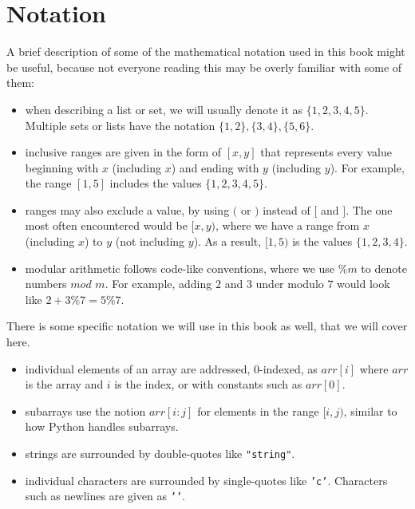 \section*{Notation}

A brief description of some of the mathematical notation used in this book might be useful, because not everyone reading this may be overly familiar with some of them:
\begin{itemize}
\item when describing a list or set, we will usually denote it as $\{1,2,3,4,5\}$. Multiple sets or lists have the notation $\{1,2\},\{3,4\},\{5,6\}$.
\item inclusive ranges are given in the form of $[x,y]$ that represents every value beginning with $x$ (including $x$) and ending with $y$ (including $y$). For example, the range $[1,5]$ includes the values $\{1,2,3,4,5\}$.
\item ranges may also exclude a value, by using $($ or $)$ instead of $[$ and $]$. The one most often encountered would be $[x,y)$, where we have a range from $x$ (including $x$) to $y$ (not including $y$). As a result, $[1,5)$ is the values $\{1,2,3,4\}$.
\item modular arithmetic follows code-like conventions, where we use $\%m$ to denote numbers $mod$ $m$. For example, adding $2$ and $3$ under modulo $7$ would look like $2 + 3 \% 7 = 5 \% 7$.
\end{itemize}

There is some specific notation we will use in this book as well, that we will cover here.
\begin{itemize}
\item individual elements of an array are addressed, 0-indexed, as $arr[i]$ where $arr$ is the array and $i$ is the index, or with constants such as $arr[0]$.
\item subarrays use the notion $arr[i:j]$ for elements in the range $[i,j)$, similar to how Python handles subarrays.
\item strings are surrounded by double-quotes like \texttt{"string"}.
\item individual characters are surrounded by single-quotes like \texttt{'c'}. Characters such as newlines are given as \texttt{'\n'}.
\end{itemize}
